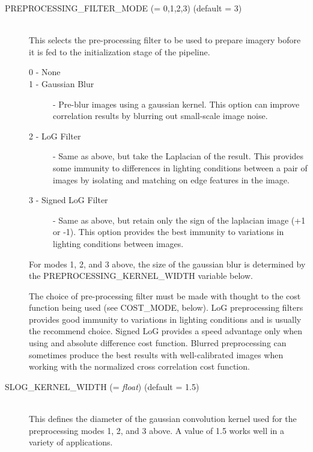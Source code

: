 \begin{description}

\item[PREPROCESSING\_FILTER\_MODE \textnormal{\small{(= 0,1,2,3)}} (default = 3)] \hfill \\

  This selects the pre-processing filter to be used to prepare imagery
  bofore it is fed to the initialization stage of the pipeline. 

  \begin{description}
    \item[0 - None]
    \item[1 - Gaussian Blur] - Pre-blur images using a gaussian
      kernel.  This option can improve correlation results by blurring
      out small-scale image noise.
    \item[2 - LoG Filter] - Same as above, but take the Laplacian of
      the result.  This provides some immunity to differences in
      lighting conditions between a pair of images by isolating and
      matching on edge features in the image.
    \item[3 - Signed LoG Filter] - Same as above, but retain only the
      sign of the laplacian image (+1 or -1).  This option provides
      the best immunity to variations in lighting conditions between
      images.
  \end{description}

  For modes 1, 2, and 3 above, the size of the gaussian blur is
  determined by the PREPROCESSING\_KERNEL\_WIDTH variable below.

  The choice of pre-processing filter must be made with thought to the
  cost function being used (see COST\_MODE, below).  LoG preprocessing
  filters provides good immunity to variations in lighting conditions
  and is usually the recommend choice.  Signed LoG provides a speed
  advantage only when using and absolute difference cost function.
  Blurred preprocessing can sometimes produce the best results with
  well-calibrated images when working with the normalized cross
  correlation cost function.

\item[SLOG\_KERNEL\_WIDTH \textnormal{\small{(= \emph{float})}} (default = 1.5)] \hfill \\

  This defines the diameter of the gaussian convolution kernel used
  for the preprocessing modes 1, 2, and 3 above. A value of 1.5 works
  well in a variety of applications.


\end{description}
